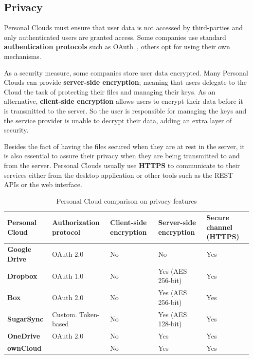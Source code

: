 \subsection{Privacy}


Personal Clouds must ensure that user data is not accessed by third-parties and only authenticated users are granted access. Some companies use standard \textbf{authentication protocols} such as OAuth~\cite{oauth}, others opt for using their own mechanisms.

As a security measure, some companies store user data encrypted. Many Personal Clouds can provide \textbf{server-side encryption}; meaning that users delegate to the Cloud the task of protecting their files and managing their keys. As an alternative, \textbf{client-side encryption} allows users to encrypt their data before it is transmitted to the server. So the user is responsible for managing the keys and the service provider is unable to decrypt their data, adding an extra layer of security.

Besides the fact of having the files secured when they are at rest in the server, it is also essential to assure their privacy when they are being transmitted to and from the server. Personal Clouds usually use \textbf{HTTPS} to communicate to their services either from the desktop application or other tools such as the REST APIs or the web interface.


{
\def\arraystretch{1.5}

\begin{table}
\begin{center}
    \begin{tabular}{ | p{3.3cm} | p{2.5cm} | p{2.2cm} | p{2.2cm} | p{2cm} | }
    \hline
    \rowcolor[gray]{0.8}

	\textbf{Personal Cloud} &
	\textbf{Authorization protocol} &
	\textbf{Client-side encryption} &
	\textbf{Server-side encryption} & 
	\textbf{Secure channel (HTTPS)} \\ \hline
	
	\textbf{Google Drive} &
	OAuth 2.0 &
	No &
	No &
	Yes \\ \hline

	\textbf{Dropbox} &
	OAuth 1.0 &
	No &
	Yes (AES 256-bit) &
	Yes \\ \hline
	
	\textbf{Box} &
	OAuth 2.0 &
	No &
	Yes (AES 256-bit) &
	Yes \\ \hline
	
	\textbf{SugarSync} & 
	Custom. Token-based &
	No &
	Yes (AES 128-bit) &
	Yes \\ \hline
	
	\textbf{OneDrive} & 
	OAuth 2.0 &
	No &
	Yes &
	Yes \\ \hline

	
	\textbf{ownCloud} &
	--- &
	No &
	Yes &
	Yes \\ \hline

    \end{tabular}
    \caption{Personal Cloud comparison on privacy features}
    \label{tab:pc_privacy}
\end{center}
\end{table}
}

